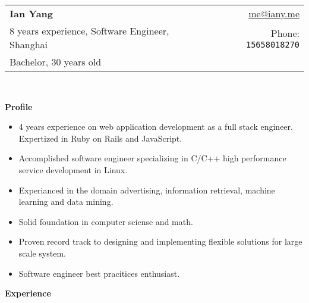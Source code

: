 \documentclass[letterpaper,11pt]{article}
\newcommand{\resheading}[1]{{\large \colorbox{mygrey}{\begin{minipage}{\textwidth}{\textbf{#1 \vphantom{p\^{E}}}}\end{minipage}}}}
\begin{document}
\newcommand{\mywebheader}{
\begin{tabular*}{7in}{l@{\extracolsep{\fill}}r}
  \textbf{\LARGE Ian Yang} & \href{mailto:me@iany.me}{me@iany.me} \\
    {\small 8 years experience, Software Engineer, Shanghai} & {\small Phone: \texttt{15658018270}} \\
    {\footnotesize Bachelor, 30 years old} & \\
  \end{tabular*}
\\
\vspace{0.1in}}

\mywebheader

\resheading{Profile}

\begin{itemize}
\item 4 years experience on web application development as a full stack
  engineer. Expertized in Ruby on Rails and JavaScript.
\item Accomplished software engineer specializing in C/C++ high
  performance service development in Linux.
\item Experianced in the domain advertising, information retrieval, machine learning and data
  mining.
\item Solid foundation in computer sciense and math.
\item Proven record track to designing and implementing flexible solutions for
  large scale system.
\item Software engineer best pracitices enthusiast.
\end{itemize}

\resheading{Experience}
\end{document}
